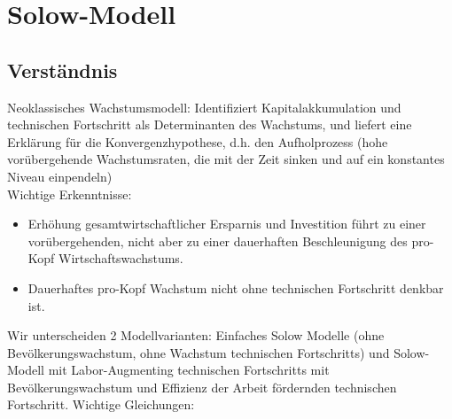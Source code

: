 \documentclass{scrartcl}
\begin{document}
\newpage
\section{Solow-Modell}
\subsection*{Verst\"{a}ndnis}
Neoklassisches Wachstumsmodell: Identifiziert Kapitalakkumulation und technischen Fortschritt als Determinanten des Wachstums, und liefert eine Erkl\"{a}rung
f\"{u}r die Konvergenzhypothese, d.h. den Aufholprozess (hohe vor\"{u}bergehende Wachstumsraten, die mit der Zeit sinken und auf ein konstantes Niveau einpendeln)\\
Wichtige Erkenntnisse:
\begin{itemize}
  \item Erh\"{o}hung gesamtwirtschaftlicher Ersparnis und Investition f\"{u}hrt zu einer vor\"{u}bergehenden, nicht aber zu einer dauerhaften Beschleunigung des pro-Kopf Wirtschaftswachstums.
  \item Dauerhaftes pro-Kopf Wachstum nicht ohne technischen Fortschritt denkbar ist.
\end{itemize}
Wir unterscheiden 2 Modellvarianten: Einfaches Solow Modelle (ohne Bev\"{o}lkerungswachstum, ohne Wachstum technischen Fortschritts) und Solow-Modell mit Labor-Augmenting technischen Fortschritts mit Bev\"{o}lkerungswachstum und Effizienz der Arbeit f\"{o}rdernden technischen Fortschritt.
Wichtige Gleichungen:
\end{document}

